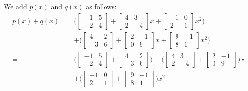We add $p(x)$ and $q(x)$ as follows:
\begin{align*}
p(x) + q(x) =&\bigg( \begin{bmatrix} 
-1 & 5  \\
-2 & 4 
\end{bmatrix}
+\begin{bmatrix} 
4 & 3 \\
2 & -4 
\end{bmatrix}
 x+\begin{bmatrix} 
-1 & 0 \\
2 & 1 
\end{bmatrix}
 x^2\bigg)\\
&+\bigg(\begin{bmatrix} 
4 & 2 \\
-3 & 6
\end{bmatrix}
+\begin{bmatrix} 
2 & -1 \\
0 & 9 
\end{bmatrix}
 x+\begin{bmatrix} 
9 & -1 \\
8 & 1 
\end{bmatrix}
 x^2\bigg)\\
= &\bigg(\begin{bmatrix} 
-1 & 5 \\
-2 & 4
\end{bmatrix}
+\begin{bmatrix} 
4 & 2 \\
-3 & 6 
\end{bmatrix}\bigg)
 +\bigg(\begin{bmatrix} 
4 & 3 \\
2 & -4 
\end{bmatrix}
+\begin{bmatrix}
2 & -1\\
0 & 9
\end{bmatrix}\bigg)x\\
&+\bigg(\begin{bmatrix}
-1 & 0 \\
2 & 1
\end{bmatrix}
+\begin{bmatrix} 
9 & -1 \\
8 & 1 
\end{bmatrix}\bigg)
 x^2\\

\end{align*}
